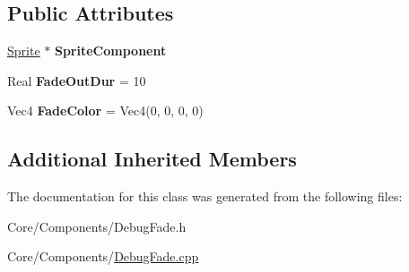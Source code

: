 \subsection*{Public Attributes}
\begin{DoxyCompactItemize}
\item 
\hypertarget{classDCEngine_1_1Components_1_1DebugFade_a406c11e704485cc641cabc290749abdc}{\hyperlink{classDCEngine_1_1Components_1_1Sprite}{Sprite} $\ast$ {\bfseries Sprite\-Component}}\label{classDCEngine_1_1Components_1_1DebugFade_a406c11e704485cc641cabc290749abdc}

\item 
\hypertarget{classDCEngine_1_1Components_1_1DebugFade_a34b8ef12d8f7919826f3eb94e2bfdbec}{Real {\bfseries Fade\-Out\-Dur} = 10}\label{classDCEngine_1_1Components_1_1DebugFade_a34b8ef12d8f7919826f3eb94e2bfdbec}

\item 
\hypertarget{classDCEngine_1_1Components_1_1DebugFade_a9fcd4d4126eb6198f32d34a87c238c50}{Vec4 {\bfseries Fade\-Color} = Vec4(0, 0, 0, 0)}\label{classDCEngine_1_1Components_1_1DebugFade_a9fcd4d4126eb6198f32d34a87c238c50}

\end{DoxyCompactItemize}
\subsection*{Additional Inherited Members}


The documentation for this class was generated from the following files\-:\begin{DoxyCompactItemize}
\item 
Core/\-Components/Debug\-Fade.\-h\item 
Core/\-Components/\hyperlink{DebugFade_8cpp}{Debug\-Fade.\-cpp}\end{DoxyCompactItemize}
